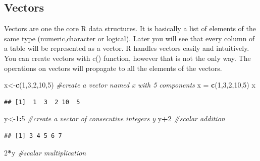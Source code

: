 \documentclass[12pt,]{krantz}
\newenvironment{Shaded}{\begin{snugshade}}{\end{snugshade}}
\newcommand{\CommentTok}[1]{\textcolor[rgb]{0.56,0.35,0.01}{\textit{#1}}}
\newcommand{\DecValTok}[1]{\textcolor[rgb]{0.00,0.00,0.81}{#1}}
\newcommand{\KeywordTok}[1]{\textcolor[rgb]{0.13,0.29,0.53}{\textbf{#1}}}
\newcommand{\NormalTok}[1]{#1}
\newcommand{\OperatorTok}[1]{\textcolor[rgb]{0.81,0.36,0.00}{\textbf{#1}}}
\newcommand{\StringTok}[1]{\textcolor[rgb]{0.31,0.60,0.02}{#1}}
\begin{document}
\hypertarget{vectors}{%
\subsection{Vectors}\label{vectors}}

Vectors are one the core R data structures. It is basically a list of elements of the same type (numeric,character or logical). Later you will see that every column of a table will be represented as a vector. R handles vectors easily and intuitively. You can create vectors with c() function, however that is not the only way. The operations on vectors will propagate to all the elements of the vectors.

\begin{Shaded}
\begin{Highlighting}[]
\NormalTok{x<-}\KeywordTok{c}\NormalTok{(}\DecValTok{1}\NormalTok{,}\DecValTok{3}\NormalTok{,}\DecValTok{2}\NormalTok{,}\DecValTok{10}\NormalTok{,}\DecValTok{5}\NormalTok{)    }\CommentTok{#create a vector named x with 5 components}
\NormalTok{x =}\StringTok{ }\KeywordTok{c}\NormalTok{(}\DecValTok{1}\NormalTok{,}\DecValTok{3}\NormalTok{,}\DecValTok{2}\NormalTok{,}\DecValTok{10}\NormalTok{,}\DecValTok{5}\NormalTok{)  }
\NormalTok{x}
\end{Highlighting}
\end{Shaded}

\begin{verbatim}
## [1]  1  3  2 10  5
\end{verbatim}

\begin{Shaded}
\begin{Highlighting}[]
\NormalTok{y<-}\DecValTok{1}\OperatorTok{:}\DecValTok{5}              \CommentTok{#create a vector of consecutive integers y}
\NormalTok{y}\OperatorTok{+}\DecValTok{2}                 \CommentTok{#scalar addition}
\end{Highlighting}
\end{Shaded}

\begin{verbatim}
## [1] 3 4 5 6 7
\end{verbatim}

\begin{Shaded}
\begin{Highlighting}[]
\DecValTok{2}\OperatorTok{*}\NormalTok{y                 }\CommentTok{#scalar multiplication}
\end{Highlighting}
\end{Shaded}
\end{document}
